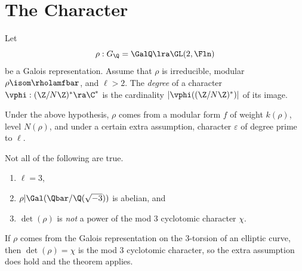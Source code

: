 \documentclass{report}
\begin{document}
\section{The Character}
Let
 $$\rho: G_\Q=\GalQ \lra \GL(2,\Fln)$$
be a Galois representation.
Assume that $\rho$ is irreducible, modular
$\rho\isom\rholamfbar$, and $\ell>2$.
The {\em degree} of a character $\vphi:(\Z/N\Z)^*\ra \C^*$ is
the cardinality $|\vphi((\Z/N\Z)^*)|$ of its image.
\begin{theorem}
Under the above hypothesis, $\rho$ comes from a modular
form $f$ of weight $k(\rho)$, level $N(\rho)$, and under a certain
extra assumption, character $\varepsilon$ of degree prime
to $\ell$.
\end{theorem}
\par{} Not all of the following are true.
\begin{enumerate}
\item $\ell=3$,
\item $\rho|\Gal(\Qbar/\Q(\sqrt{-3}))$ is abelian, and
\item $\det(\rho)$ is {\em not} a power of
       the mod 3 cyclotomic character $\chi$.
\end{enumerate}

\begin{example}
If $\rho$ comes from the Galois representation on the $3$-torsion of an
elliptic curve, then $\det(\rho)=\chi$ is the mod 3 cyclotomic character,
so the extra assumption does hold and the theorem applies.
\end{example}
\end{document}
